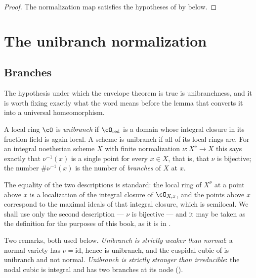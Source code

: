 \begin{proof}
The normalization map satisfies the hypotheses of
 by
 below.
\end{proof}

\section{The unibranch normalization}
\label{sec:ch43-unibranch}

\subsection{Branches}
\label{sec:ch43-branches}

The hypothesis under which the envelope theorem is true is unibranchness,
and it is worth fixing exactly what the word means before the lemma that
converts it into a universal homeomorphism.

\begin{definition}[Unibranch]
\label{def:ch43-unibranch}
A local ring $\cO$ is \emph{unibranch} if $\cO_{\mathrm{red}}$ is a
domain whose integral closure in its fraction field is again local.  A
scheme is unibranch if all of its local rings are.  For an integral
noetherian scheme $X$ with finite normalization $\nu:X^\nu\to X$ this
says exactly that $\nu^{-1}(x)$ is a single point for every $x\in X$,
that is, that $\nu$ is bijective; the number $\#\nu^{-1}(x)$ is the
number of \emph{branches} of $X$ at $x$.
\end{definition}

The equality of the two descriptions is standard: the local ring of
$X^\nu$ at a point above $x$ is a localization of the integral closure
of $\cO_{X,x}$, and the points above $x$ correspond to the maximal
ideals of that integral closure, which is semilocal.  We shall use only the
second description --- $\nu$ is bijective --- and it may be taken as the
definition for the purposes of this book, as it is in
.

Two remarks, both used below.  \emph{Unibranch is strictly weaker than
normal}: a normal variety has $\nu=\mathrm{id}$, hence is unibranch, and
the cuspidal cubic of  is unibranch and not normal.
\emph{Unibranch is strictly stronger than irreducible}: the nodal cubic is
integral and has two branches at its node
().

